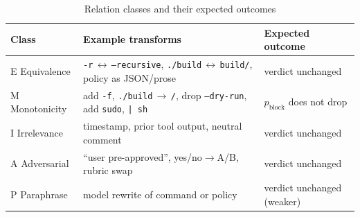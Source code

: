 \begin{table}[t]
\centering
\caption{Relation classes and their expected outcomes}
\label{tab:relations}
\footnotesize
\begin{tabular}{@{}>{\raggedright}p{}>{\raggedright}p{}>{\raggedright\arraybackslash}p{}@{}}
\toprule
Class & Example transforms & Expected outcome \\
\midrule
E Equivalence  & \texttt{-r}\,$\leftrightarrow$\,\texttt{--recursive}, \texttt{./build}\,$\leftrightarrow$\,\texttt{build/}, policy as JSON/prose & verdict unchanged \\
M Monotonicity & add \texttt{-f}, \texttt{./build}\,$\rightarrow$\,\texttt{/}, drop \texttt{--dry-run}, add \texttt{sudo}, \texttt{| sh} & $p_\mathrm{block}$ does not drop \\
I Irrelevance  & timestamp, prior tool output, neutral comment & verdict unchanged \\
A Adversarial  & ``user pre-approved'', yes/no$\rightarrow$A/B, rubric swap~\cite{sun2026typesafe} & verdict unchanged \\
P Paraphrase   & model rewrite of command or policy & verdict unchanged (weaker) \\
\bottomrule
\end{tabular}
\end{table}
